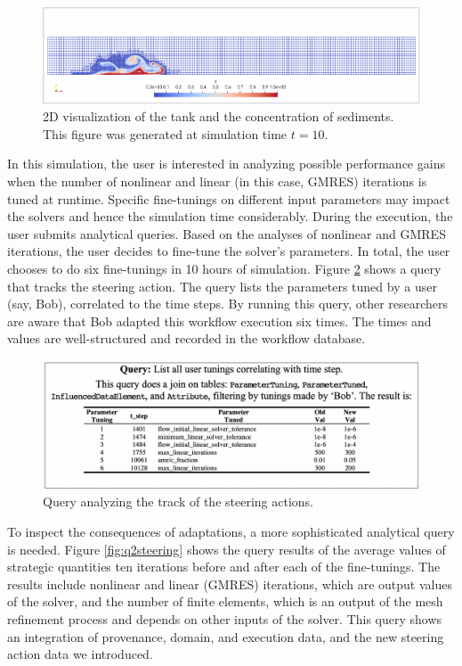 \begin{figure}[H]
    \centering
    \includegraphics[width=\textwidth,keepaspectratio]{img/tank2d.pdf}
    \caption{2D visualization of the tank and the concentration of sediments. This figure was generated at simulation time $t = 10$.}
    \label{fig:2dtanks}
\end{figure}

In this simulation, the user is interested in analyzing possible performance gains when the number of nonlinear and linear (in this case, GMRES) iterations is tuned at runtime. Specific fine-tunings on different input parameters may impact the solvers and hence the simulation time considerably. During the execution, the user submits analytical queries. Based on the analyses of nonlinear and GMRES iterations, the user decides to fine-tune the solver’s parameters. In total, the user chooses to do six fine-tunings in 10 hours of simulation. Figure \ref{fig:q1steering} shows a query
that tracks the steering action. The query lists the parameters tuned by a user (say, Bob), correlated to the time steps. By running this query, other researchers are aware that Bob adapted this workflow execution six times. The times and values are well-structured and recorded in the workflow database.

\begin{figure}[H]
    \centering
    \includegraphics[width=\textwidth,keepaspectratio]{img/param_tun_q1.pdf}
    \caption{Query analyzing the track of the steering actions.}
    \label{fig:q1steering}
\end{figure}



To inspect the consequences of adaptations, a more sophisticated
analytical query is needed. Figure \ref{fig:q2steering} shows the query results
of the average values of strategic quantities ten iterations before and after each of the  fine-tunings. The results include nonlinear and linear (GMRES)
iterations, which are output values of the solver, and the number of
finite elements, which is an output of the mesh refinement process and
depends on other inputs of the solver. This query shows an integration
of provenance, domain, and execution data, and the new steering action data we introduced.

